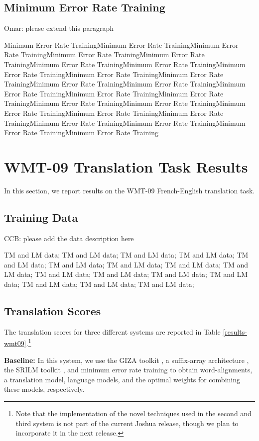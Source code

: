 \documentclass[11pt]{article}
\begin{document}
\subsection{Minimum Error Rate Training}
Omar: please extend this paragraph

Minimum Error Rate TrainingMinimum Error Rate TrainingMinimum Error Rate TrainingMinimum Error Rate TrainingMinimum Error Rate TrainingMinimum Error Rate TrainingMinimum Error Rate TrainingMinimum Error Rate TrainingMinimum Error Rate TrainingMinimum Error Rate TrainingMinimum Error Rate TrainingMinimum Error Rate TrainingMinimum Error Rate TrainingMinimum Error Rate TrainingMinimum Error Rate TrainingMinimum Error Rate TrainingMinimum Error Rate TrainingMinimum Error Rate TrainingMinimum Error Rate TrainingMinimum Error Rate TrainingMinimum Error Rate TrainingMinimum Error Rate TrainingMinimum Error Rate TrainingMinimum Error Rate Training



\section{WMT-09 Translation Task Results}
In this section, we report results on the WMT-09 French-English translation task.
\subsection{Training Data}
CCB: please add the data description here

TM and LM data; TM and LM data; TM and LM data; TM and LM data; TM and LM data; TM and LM data; TM and LM data; TM and LM data; TM and LM data; TM and LM data; TM and LM data; TM and LM data; TM and LM data; TM and LM data; TM and LM data; TM and LM data;


\subsection{Translation Scores}
The translation scores for three different systems are reported in Table \ref{results-wmt09}.\footnote{Note that the implementation of the novel techniques used in the second and third system is not part of the current Joshua release, though we plan to incorporate it in the next release.}


\textbf{Baseline: } In this system, we use the GIZA toolkit \cite{giza}, a suffix-array architecture \cite{adam-suffix}, the SRILM toolkit \cite{srilm}, and minimum error rate training \cite{discriminative-mert} to obtain word-alignments, a translation model, language models, and the optimal weights for combining these models, respectively.
\end{document}
